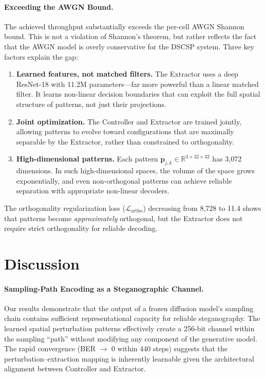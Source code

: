 \documentclass[10pt, twocolumn]{article}
\newcommand{\R}{\mathbb{R}}
\newcommand{\Lcal}{\mathcal{L}}
\begin{document}
\paragraph{Exceeding the AWGN Bound.}
The achieved throughput substantially exceeds the per-cell AWGN Shannon bound.
This is not a violation of Shannon's theorem, but rather reflects the fact that the AWGN model is overly conservative for the DSCSP system.
Three key factors explain the gap:
\begin{enumerate}[itemsep=1pt, topsep=2pt]
    \item \textbf{Learned features, not matched filters.} The Extractor uses a deep ResNet-18 with 11.2M parameters---far more powerful than a linear matched filter. It learns non-linear decision boundaries that can exploit the full spatial structure of patterns, not just their projections.
    \item \textbf{Joint optimization.} The Controller and Extractor are trained jointly, allowing patterns to evolve toward configurations that are maximally separable by the Extractor, rather than constrained to orthogonality.
    \item \textbf{High-dimensional patterns.} Each pattern $\mathbf{p}_{j,k} \in \R^{3 \times 32 \times 32}$ has 3{,}072 dimensions. In such high-dimensional spaces, the volume of the space grows exponentially, and even non-orthogonal patterns can achieve reliable separation with appropriate non-linear decoders.
\end{enumerate}

The orthogonality regularization loss ($\Lcal_\text{ortho}$) decreasing from 8{,}728 to 11.4 shows that patterns become \emph{approximately} orthogonal, but the Extractor does not require strict orthogonality for reliable decoding.


\section{Discussion}
\label{sec:discussion}

\paragraph{Sampling-Path Encoding as a Steganographic Channel.}
Our results demonstrate that the output of a frozen diffusion model's sampling chain contains sufficient representational capacity for reliable steganography.
The learned spatial perturbation patterns effectively create a 256-bit channel within the sampling ``path'' without modifying any component of the generative model.
The rapid convergence (BER $\to$ 0 within 440 steps) suggests that the perturbation--extraction mapping is inherently learnable given the architectural alignment between Controller and Extractor.
\end{document}
